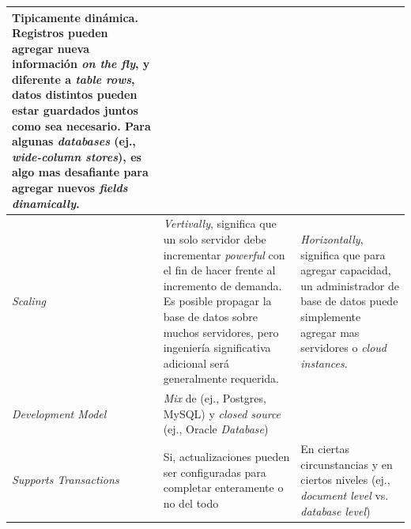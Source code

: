 \begin{table}[h!]
\begin{tabular}{ |L{0.1\paperwidth}|L{0.3\paperwidth}|L{0.3\paperwidth}|}
	Tipicamente dinámica. Registros pueden agregar nueva información \textit{on the fly}, y diferente a \textit{ table rows}, datos distintos pueden estar guardados juntos como sea necesario. Para algunas \textit{databases} (ej., \textit{wide-column stores}), es algo mas desafiante para agregar nuevos \textit{fields dinamically}.

\\ \hline
	\textit{Scaling}&%
	
	\textit{Vertivally}, significa que un solo servidor debe incrementar \textit{powerful} con el fin de hacer frente al incremento de demanda. Es posible propagar la base de datos  sobre muchos servidores, pero ingeniería significativa adicional será generalmente requerida.&
	
	\textit{Horizontally}, significa que para agregar capacidad, un administrador de base de datos puede simplemente agregar mas servidores o \textit{cloud instances}.
	
\\ \hline
	\textit{Development Model}&
	
	\textit{Mix} de \opensource (ej., Postgres, MySQL) y \textit{closed source} (ej., Oracle \textit{Database})&
	\opensource
	
\\ \hline
	\textit{Supports Transactions}&
	
	Si, actualizaciones pueden ser configuradas para completar enteramente o no del todo&	
	
	En ciertas circunstancias y en ciertos niveles (ej., \textit{document level} vs. \textit{database level})
	

\end{tabular}
\end{table}
